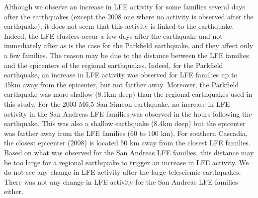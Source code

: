 \documentclass[draft]{agujournal2019}
\begin{document}
Although we observe an increase in LFE activity for some families several days after the earthquakes (except the 2008 one where no activity is observed after the earthquake), it does not seem that this activity is linked to the earthquake. Indeed, the LFE clusters occur a few days after the earthquake and not immediately after as is the case for the Parkfield earthquake, and they affect only a few families. The reason may be due to the distance between the LFE families and the epicenters of the regional earthquakes. Indeed, for the Parkfield earthquake, an increase in LFE activity was observed for LFE families up to 45km away from the epicenter, but not farther away. Moreover, the Parkfield earthquake was more shallow (8.1km deep) than the regional earthquakes used in this study. For the 2003 M6.5 San Simeon earthquake, no increase in LFE activity in the San Andreas LFE families was observed in the hours following the earthquake. This was also a shallow earthquake (8.4km deep) but the epicenter was farther away from the LFE families (60 to 100 km). For southern Cascadia, the closest epicenter (2008) is located 50 km away from the closest LFE families. Based on what was observed for the San Andreas LFE families, this distance may be too large for a regional earthquake to trigger an increase in LFE activity. We do not see any change in LFE activity after the large teleseismic earthquakes. There was not any change in LFE activity for the San Andreas LFE families either. \\
\end{document}
